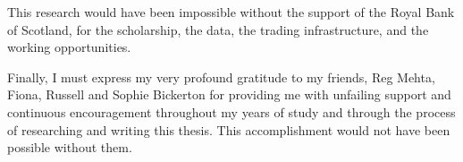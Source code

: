 \documentclass[12pt,a4paper,oneside,titlepage]{book}
\begin{document}
\begin{onehalfspace}
This research would have been impossible without the support of the Royal Bank of Scotland, for the scholarship, the data, the trading infrastructure, and the working opportunities.

Finally, I must express my very profound gratitude to my friends, Reg Mehta, Fiona, Russell and Sophie Bickerton for providing me with unfailing support and continuous encouragement throughout my years of study and through the process of researching and writing this thesis. This accomplishment would not have been possible without them. 




\end{onehalfspace}
\clearpage
\begin{doublespace}
{}
\tableofcontents		%







 

\end{doublespace}
\end{document}
